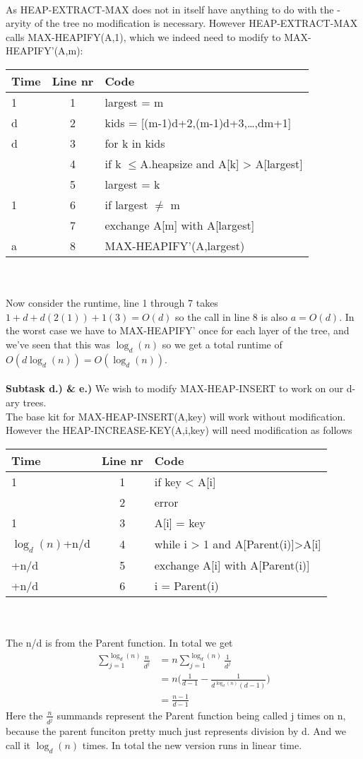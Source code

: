 \documentclass{article}
\theoremstyle{remark}
\numberwithin{equation}{section}
\begin{document}
\\As HEAP-EXTRACT-MAX does not in itself have anything to do with the -aryity of the tree no modification is necessary. However HEAP-EXTRACT-MAX calls MAX-HEAPIFY(A,1), which we indeed need to modify to MAX-HEAPIFY'(A,m):
\\\begin{tabular}{l | c | l}
	Time & Line nr & Code \\ \hline
	1 & 1 & largest = m \\
	d & 2 & kids = [(m-1)d+2,(m-1)d+3,\dots,dm+1] \\
	d & 3 & for k in kids \\
	\indent 2 & 4 & \indent if k $\leq $A.heapsize and A[k] > A[largest] \\
	\indent\indent 1 & 5 & \indent\indent largest = k \\
	1 & 6 & if largest $\neq$ m \\
	\indent3 & 7 & \indent exchange A[m] with A[largest] \\
	a & 8 & \indent MAX-HEAPIFY'(A,largest)
\end{tabular}\\\\
Now consider the runtime, line 1 through 7 takes $1+d+d(2(1))+1(3)= O(d)$ so the call in line 8 is also $a = O(d)$. In the worst case we have to MAX-HEAPIFY' once for each layer of the tree, and we've seen that this was $\log_d(n)$ so we get a total runtime of $O(d\log_d(n)) = O(\log_d(n))$.
\\\\\textbf{Subtask d.) \& e.)} We wish to modify MAX-HEAP-INSERT to work on our d-ary trees.
\\The base kit for MAX-HEAP-INSERT(A,key) will work without modification. However the HEAP-INCREASE-KEY(A,i,key) will need modification as follows
\\\begin{tabular}{l | c | l}
	Time & Line nr & Code \\ \hline
	1 & 1 & if key < A[i] \\
	\indent 1 & 2 & \indent error \\
	1 & 3 & A[i] = key \\
	$\log_d(n)$+n/d & 4 & while i > 1 and A[Parent(i)]>A[i] \\
	\indent 3+n/d & 5 & \indent exchange A[i] with A[Parent(i)] \\
	\indent 1+n/d & 6 & \indent i = Parent(i) 
\end{tabular}\\\\
The n/d is from the Parent function. In total we get
\begin{align*}
	\sum_{j = 1}^{\log_d(n)} \frac{n}{d^j} &= n \sum_{j = 1}^{\log_d(n)} \frac{1}{d^j}\\  &= n \bigg(\frac{1}{d-1}-\frac{1}{d^{\log_d(n)}(d-1)}\bigg) \\
	& = \frac{n-1}{d-1}
\end{align*}
Here the $\frac{n}{d^j}$ summands represent the Parent function being called j times on n, because the parent funciton pretty much just represents division by d. And we call it $\log_d(n)$ times. In total the new version runs in linear time.
\end{document}
